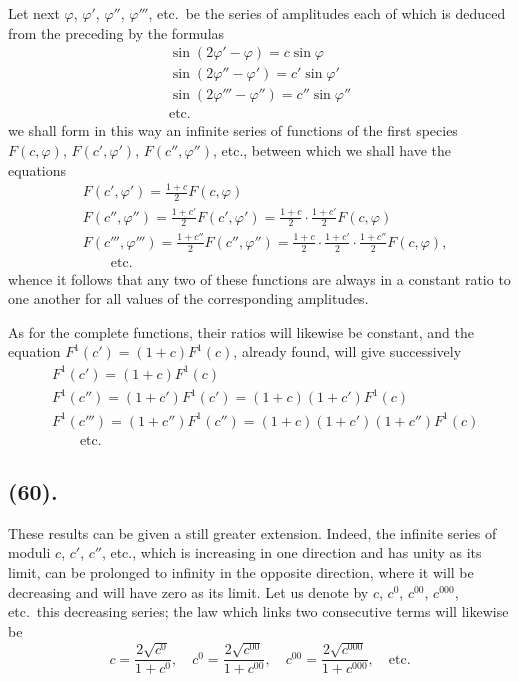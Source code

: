 \documentclass{article}
\begin{document}
Let next $\varphi$, $\varphi'$, $\varphi''$, $\varphi'''$, etc.\ be the series of amplitudes each of which is deduced from the preceding by the formulas
\[ \begin{gathered} \sin(2\varphi'-\varphi)=c\sin\varphi\\ \sin(2\varphi''-\varphi')=c'\sin\varphi'\\ \sin(2\varphi'''-\varphi'')=c''\sin\varphi''\\ \text{etc.} \end{gathered} \]
we shall form in this way an infinite series of functions of the first species $F(c,\varphi)$, $F(c',\varphi')$, $F(c'',\varphi'')$, etc., between which we shall have the equations
\[ \begin{aligned} &F(c',\varphi')=\frac{1+c}{2}F(c,\varphi)\\ &F(c'',\varphi'')=\frac{1+c'}{2}F(c',\varphi')=\frac{1+c}{2}\cdot\frac{1+c'}{2}F(c,\varphi)\\ &F(c''',\varphi''')=\frac{1+c''}{2}F(c'',\varphi'')=\frac{1+c}{2}\cdot\frac{1+c'}{2}\cdot\frac{1+c''}{2}F(c,\varphi),\\ &\qquad\text{etc.} \end{aligned} \]
whence it follows that any two of these functions are always in a constant ratio to one another for all values of the corresponding amplitudes.

As for the complete functions, their ratios will likewise be constant, and the equation $F^{1}(c')=(1+c)F^{1}(c)$, already found, will give successively
\[ \begin{aligned} &F^{1}(c')=(1+c)F^{1}(c)\\ &F^{1}(c'')=(1+c')F^{1}(c')=(1+c)(1+c')F^{1}(c)\\ &F^{1}(c''')=(1+c'')F^{1}(c'')=(1+c)(1+c')(1+c'')F^{1}(c)\\ &\qquad\text{etc.} \end{aligned} \]

\subsection*{(60).}

These results can be given a still greater extension. Indeed, the infinite series of moduli $c$, $c'$, $c''$, etc., which is increasing in one direction and has unity as its limit, can be prolonged to infinity in the opposite direction, where it will be decreasing and will have zero as its limit. Let us denote by $c$, $c^{0}$, $c^{00}$, $c^{000}$, etc.\ this decreasing series; the law which links two consecutive terms will likewise be
\[ c=\frac{2\sqrt{c^{0}}}{1+c^{0}},\quad c^{0}=\frac{2\sqrt{c^{00}}}{1+c^{00}},\quad c^{00}=\frac{2\sqrt{c^{000}}}{1+c^{000}},\quad\text{etc.} \]
\end{document}
